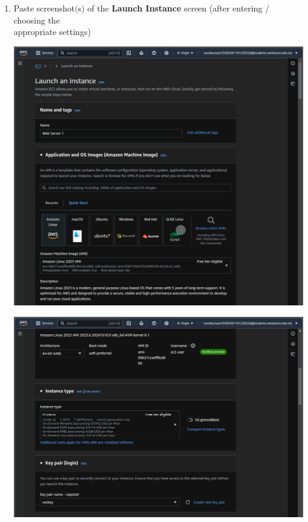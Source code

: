 \documentclass[11pt]{article}
\begin{document}
\begin{enumerate}[resume]
    \item Paste screenshot$($s$)$ of the \textbf{Launch Instance} screen (after entering / choosing the \\ appropriate settings) \\
    \vspace{-0.02mm}

    {\centering
    \includegraphics[width=5.8in]{pics/14a.png}
    }

    {\centering
    \includegraphics[width=5.8in]{pics/14b.png}
    }



\end{enumerate}
\end{document}

